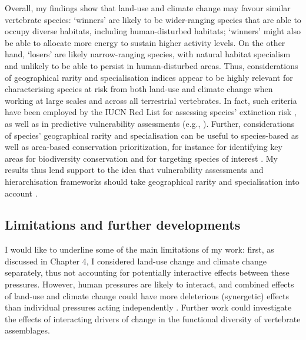Overall, my findings show that land-use and climate change may favour similar vertebrate species: `winners' are likely to be wider-ranging species that are able to occupy diverse habitats, including human-disturbed habitats; `winners' might also be able to allocate more energy to sustain higher activity levels. On the other hand, `losers' are likely narrow-ranging species, with natural habitat specialism and unlikely to be able to persist in human-disturbed areas. Thus, considerations of geographical rarity and specialisation indices appear to be highly relevant for characterising species at risk from both land-use and climate change when working at large scales and across all terrestrial vertebrates. In fact, such criteria have been employed by the IUCN Red List for assessing species' extinction risk \citep{Rodrigues2006}, as well as in predictive vulnerability assessments (e.g., \citet{Foden2013}). Further, considerations of species' geographical rarity and specialisation can be useful to species-based as well as area-based conservation prioritization, for instance for identifying key areas for biodiversity conservation and for targeting species of interest \citep{Asaad2017, Mace2006}. My results thus lend support to the idea that vulnerability assessments and hierarchisation frameworks should take geographical rarity and specialisation into account \citep{LeBerre2019}.

\subsection{Limitations and further developments}
I would like to underline some of the main limitations of my work: first, as discussed in Chapter 4, I considered land-use change and climate change separately, thus not accounting for potentially interactive effects between these pressures. However, human pressures are likely to interact, and combined effects of land-use and climate change could have more deleterious (synergetic) effects than individual pressures acting independently \citep{Williams2020a, Williams2022}. Further work could investigate the effects of interacting drivers of change in the functional diversity of vertebrate assemblages.

